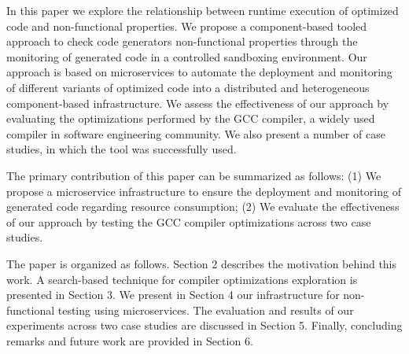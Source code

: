 In this paper we explore the relationship between runtime execution of optimized code and non-functional properties.
We propose a component-based tooled approach to check code generators non-functional properties through the monitoring of generated code in a controlled sandboxing environment. 
Our approach is based on microservices to automate the deployment and monitoring of different variants of optimized code into a distributed and heterogeneous component-based infrastructure. 
We assess the effectiveness of our approach by evaluating the optimizations performed by the GCC compiler, a widely used compiler in software engineering community. 
We also present a number of case studies, in which the tool was successfully used.

The primary contribution of this paper can be summarized as follows: 
(1) We propose a microservice infrastructure to ensure the deployment and monitoring of generated code regarding resource consumption; 
(2) We evaluate the effectiveness of our approach by testing the GCC compiler optimizations across two case studies.
 

The paper is organized as follows.
Section 2 describes the motivation behind this work. A search-based technique for compiler optimizations exploration is presented in Section 3. 
We present in Section 4 our infrastructure for non-functional testing using microservices. 
The evaluation and results of our experiments across two case studies are discussed in Section 5. 
Finally, concluding remarks and future work are provided in Section 6.




 
 


